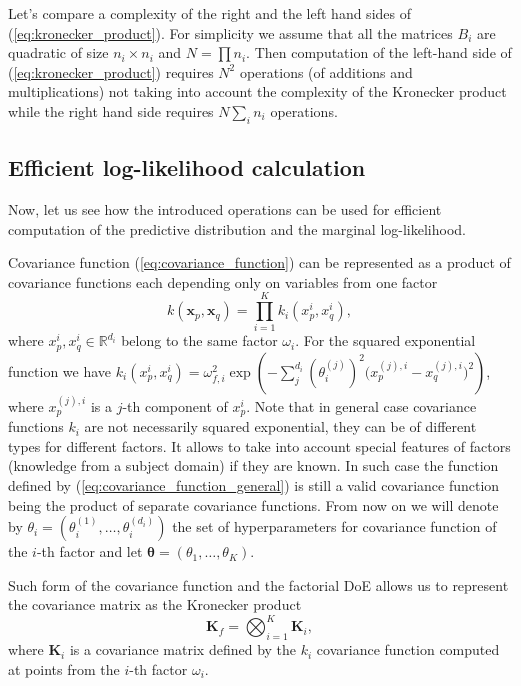 Let's compare a complexity of the right and the left hand sides of (\ref{eq:kronecker_product}).
For simplicity we assume that all the matrices $B_i$ are quadratic of size $n_i \times n_i$ and
$N = \prod n_i$.
Then computation of the left-hand side of (\ref{eq:kronecker_product}) requires
$N^2$ operations (of additions and multiplications) not taking into account the complexity of the Kronecker product
while the right hand side requires $N \sum_i n_i$ operations.


\subsection{Efficient log-likelihood calculation}
\label{sec:calc_loglikelihood}
Now, let us see how the introduced operations can be used for efficient
computation of the predictive distribution and the marginal log-likelihood.

Covariance function (\ref{eq:covariance_function}) can be represented as
a product of covariance functions each depending only on variables from one factor
\begin{equation}
  \label{eq:covariance_function_general}
  k(\mathbf{x}_p, \mathbf{x}_q) = \prod_{i = 1}^K k_i(x_p^i, x_q^i),
\end{equation}
where $x_p^i, x_q^i \in \mathbb{R}^{d_i}$ belong to the same factor $\omega_i$.
For the squared exponential function we have $k_i(x_p^i, x_q^i) = \omega_{f, i}^2\exp \left ( -\sum_j^{d_i} \left (\theta_i^{(j)} \right )^2
  \big (x_p^{(j), i} - x_q^{(j), i} \big )^2 \right )$,
where $x_p^{(j), i}$ is a $j$-th component of $x_p^i$.
Note that in general case covariance functions $k_i$ are not necessarily squared exponential, they can be of different types for different factors.
It allows to take into account special features of factors (knowledge from a subject domain) if they are known.
In such case the function defined by (\ref{eq:covariance_function_general}) is still a valid
covariance function being the product of separate covariance functions.
From now on we will denote by $\theta_i = (\theta_i^{(1)}, \ldots, \theta_i^{(d_i)})$ the set of hyperparameters for covariance
function of the $i$-th factor and let $\boldsymbol{\theta} = (\theta_1, \ldots, \theta_K)$.

Such form of the covariance function and the factorial DoE
allows us to represent the covariance matrix as the Kronecker product
\begin{equation}
  \label{eq:covariance_kronecker}
  \mathbf{K}_f = \bigotimes_{i = 1}^K\mathbf{K}_i,
\end{equation}
where $\mathbf{K}_i$ is a covariance matrix defined by the $k_i$ covariance function
computed at points from the $i$-th factor $\omega_i$.

